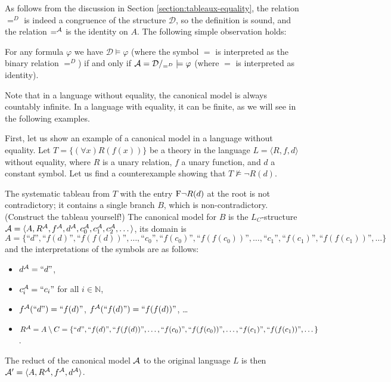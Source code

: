 As follows from the discussion in Section \ref{section:tableaux-equality}, the relation $=^D$ is indeed a congruence of the structure $\mathcal D$, so the definition is sound, and the relation $=^{\mathcal{A}}$ is the identity on $A$. The following simple observation holds:

\begin{observation}\label{canonical-with-equality-satisfies-the-same}
    For any formula $\varphi$ we have $\mathcal D\models\varphi$ (where the symbol $=$ is interpreted as the binary relation $=^D$) if and only if $\mathcal{A}=\mathcal D/_{=^D}\models\varphi$ (where $=$ is interpreted as identity).    
\end{observation}

Note that in a language without equality, the canonical model is always countably infinite. In a language with equality, it can be finite, as we will see in the following examples.

\begin{example}
    First, let us show an example of a canonical model in a language without equality. Let $T=\{(\forall x)R(f(x))\}$ be a theory in the language $L=\langle R,f,d \rangle$ without equality, where $R$ is a unary relation, $f$ a unary function, and $d$ a constant symbol. Let us find a counterexample showing that $T\not\models\neg R(d)$. 
    
    The systematic tableau from $T$ with the entry $\mathrm{F}\neg R(d)$ at the root is not contradictory; it contains a single branch $B$, which is non-contradictory. (Construct the tableau yourself!) The canonical model for $B$ is the $L_C$-structure $\mathcal{A}=\langle A,R^{\mathcal{A}},f^{\mathcal{A}},d^{\mathcal{A}},c_0^{\mathcal{A}},c_1^{\mathcal{A}},c_2^{\mathcal{A}},\dots\rangle$, its domain is
    $$
    A=\{\text{``$d$''},\text{``$f(d)$''},\text{``$f(f(d))$''},\dots,\text{``$c_0$''},\text{``$f(c_0)$''},\text{``$f(f(c_0))$''},\dots,\text{``$c_1$''},\text{``$f(c_1)$''},\text{``$f(f(c_1))$''},\dots\}
    $$
    and the interpretations of the symbols are as follows:
    \begin{itemize}
        \item $d^{\mathcal{A}}=\text{``$d$''}$,
        \item $c^{\mathcal{A}}_i=\text{``$c_i$''}$ for all $i\in \mathbb N$,
        \item $f^{\mathcal{A}}(\text{``$d$''})=\text{``$f(d)$''}$, $f^{\mathcal{A}}(\text{``$f(d)$''})=\text{``$f(f(d))$''}$, \dots
        \item $R^{\mathcal{A}}=A\setminus C=\{\text{``$d$''},\text{``$f(d)$''},\text{``$f(f(d))$''},\dots,\text{``$f(c_0)$''},\text{``$f(f(c_0))$''},\dots,\text{``$f(c_1)$''},\text{``$f(f(c_1))$''},\dots\}$.
    \end{itemize}
    The reduct of the canonical model $\mathcal{A}$ to the original language $L$ is then $\mathcal{A}'=\langle A, R^{\mathcal{A}}, f^{\mathcal{A}}, d^{\mathcal{A}}\rangle$.
\end{example}

